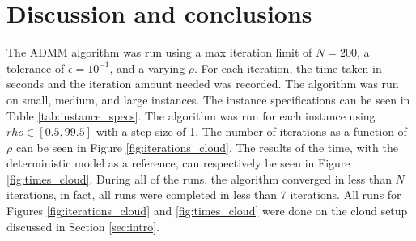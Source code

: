 \documentclass[a4paper]{artikel3}
\begin{document}
\section{Discussion and conclusions}



The ADMM algorithm was run using a max iteration limit of $N=200$, a tolerance of $\epsilon=10^{-1}$, and a varying $\rho$. For each iteration, the time taken in seconds and the iteration amount needed was recorded. The algorithm was run on small, medium, and large instances. The instance specifications can be seen in Table \ref{tab:instance_specs}. The algorithm was run for each instance using $rho \in [0.5,99.5]$ with a step size of 1. The number of iterations as a function of $\rho$ can be seen in Figure \ref{fig:iterations_cloud}. The results of the time, with the deterministic model as a reference, can respectively be seen in Figure \ref{fig:times_cloud}. During all of the runs, the algorithm converged in less than $N$ iterations, in fact, all runs were completed in less than 7 iterations. All runs for Figures \ref{fig:iterations_cloud} and \ref{fig:times_cloud} were done on the cloud setup discussed in Section \ref{sec:intro}.
\end{document}
